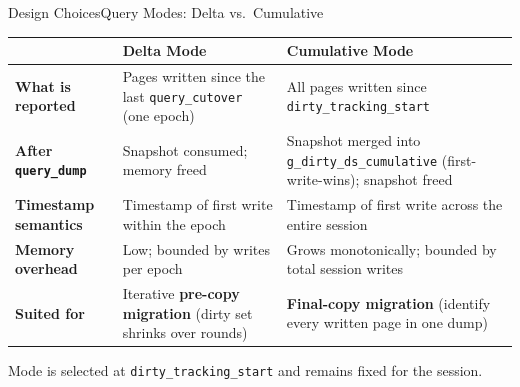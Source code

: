 
\begin{frame}[c]{Design Choices}{Query Modes: Delta vs.\ Cumulative}
\begin{center}
\renewcommand{\arraystretch}{1.35}
\footnotesize
\begin{tabular}{p{32mm} p{48mm} p{48mm}}
\toprule
 & \textbf{Delta Mode} & \textbf{Cumulative Mode} \\
\midrule
\textbf{What is reported} &
    Pages written since the last \texttt{query\_cutover} (one epoch) &
    All pages written since \texttt{dirty\_tracking\_start} \\
\textbf{After \texttt{query\_dump}} &
    Snapshot consumed; memory freed &
    Snapshot merged into \texttt{g\_dirty\_ds\_cumulative} (first-write-wins); snapshot freed \\
\textbf{Timestamp semantics} &
    Timestamp of first write within the epoch &
    Timestamp of first write across the entire session \\
\textbf{Memory overhead} &
    Low; bounded by writes per epoch &
    Grows monotonically; bounded by total session writes \\
\textbf{Suited for} &
    Iterative \textbf{pre-copy migration} (dirty set shrinks over rounds) &
    \textbf{Final-copy migration} (identify every written page in one dump) \\
\bottomrule
\end{tabular}
\end{center}
\vspace{2mm}
{\small Mode is selected at \texttt{dirty\_tracking\_start} and remains fixed for the session.}
\end{frame}

